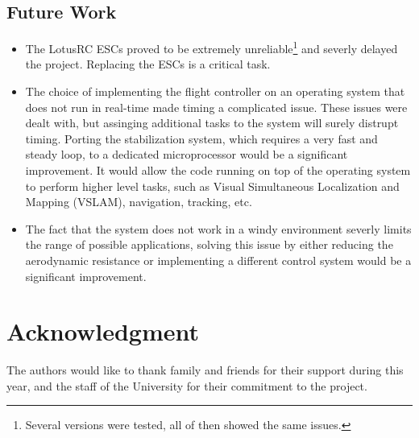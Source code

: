 \documentclass[conference]{IEEEtran}
\begin{document}
\subsection{Future Work}
\begin{itemize}
\item The LotusRC ESCs proved to be extremely unreliable\footnote{Several versions were tested, all of then showed the same issues.} and severly delayed the project. Replacing the ESCs is a critical task.
\item The choice of implementing the flight controller on an operating system that does not run in real-time made timing a complicated issue. These issues were dealt with, but assinging additional tasks to the system will surely distrupt timing. Porting the stabilization system, which requires a very fast and steady loop, to a dedicated microprocessor would be a significant improvement. It would allow the code running on top of the operating system to perform higher level tasks, such as Visual Simultaneous Localization and Mapping (VSLAM), navigation, tracking, etc.
\item The fact that the system does not work in a windy environment severly limits the range of possible applications, solving this issue by either reducing the aerodynamic resistance or implementing a different control system would be a significant improvement.
\end{itemize}



\section*{Acknowledgment}

The authors would like to thank family and friends for their support during this year, and the staff of the University for their commitment to the project.



%
%
%
 



\end{document}
